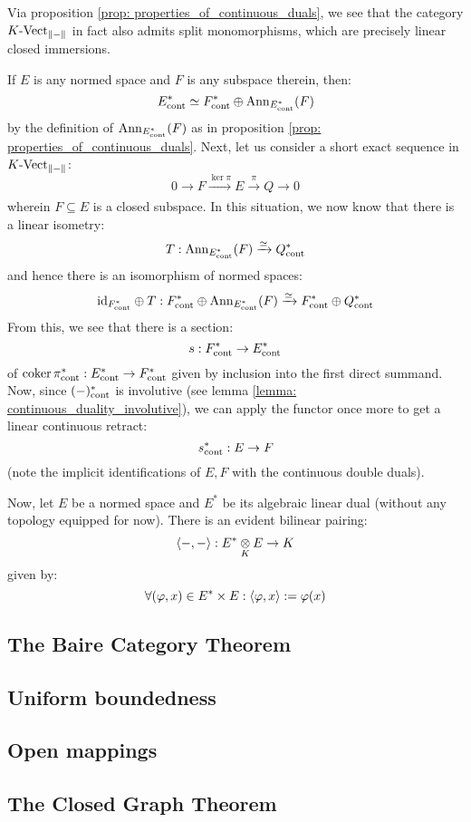         \begin{remark}
            Via proposition \ref{prop: properties_of_continuous_duals}, we see that the category $K\text{-}\mathrm{Vect}_{\left\| {-} \right\|}$ in fact also admits split monomorphisms, which are precisely linear closed immersions.

            If $E$ is any normed space and $F$ is any subspace therein, then:
                $$E^*_{\mathrm{cont}} \simeq F^*_{\mathrm{cont}} \oplus \mathrm{Ann}_{E^*_{\mathrm{cont}}}(F)$$
            by the definition of $\mathrm{Ann}_{E^*_{\mathrm{cont}}}(F)$ as in proposition \ref{prop: properties_of_continuous_duals}. Next, let us consider a short exact sequence in $K\text{-}\mathrm{Vect}_{\left\| {-} \right\|}$:
                $$0 \to F \xrightarrow[]{\ker \pi} E \xrightarrow[]{\pi} Q \to 0$$
            wherein $F \subseteq E$ is a closed subspace. In this situation, we now know that there is a linear isometry:
                $$T: \mathrm{Ann}_{E^*_{\mathrm{cont}}}(F) \xrightarrow[]{\simeq} Q^*_{\mathrm{cont}}$$
            and hence there is an isomorphism of normed spaces:
                $$\mathrm{id}_{F^*_{\mathrm{cont}}} \oplus T: F^*_{\mathrm{cont}} \oplus \mathrm{Ann}_{E^*_{\mathrm{cont}}}(F) \xrightarrow[]{\simeq} F^*_{\mathrm{cont}} \oplus Q^*_{\mathrm{cont}}$$
            From this, we see that there is a section:
                $$s: F^*_{\mathrm{cont}} \to E^*_{\mathrm{cont}}$$
            of $\operatorname{coker} \pi^*_{\mathrm{cont}}: E^*_{\mathrm{cont}} \to F^*_{\mathrm{cont}}$ given by inclusion into the first direct summand. Now, since $(-)^*_{\mathrm{cont}}$ is involutive (see lemma \ref{lemma: continuous_duality_involutive}), we can apply the functor once more to get a linear continuous retract:
                $$s^*_{\mathrm{cont}}: E \to F$$
            (note the implicit identifications of $E, F$ with the continuous double duals).
        \end{remark}

        Now, let $E$ be a normed space and $E^*$ be its algebraic linear dual (without any topology equipped for now). There is an evident bilinear pairing:
            $$\<-, -\>: E^* \tensor_K E \to K$$
        given by:
            $$\forall (\varphi, x) \in E^* \x E: \<\varphi, x\> := \varphi(x)$$
        \begin{definition} \label{def: weak_topology}
            
        \end{definition}

    \subsection{The Baire Category Theorem}

    \subsection{Uniform boundedness}

    \subsection{Open mappings}

    \subsection{The Closed Graph Theorem}